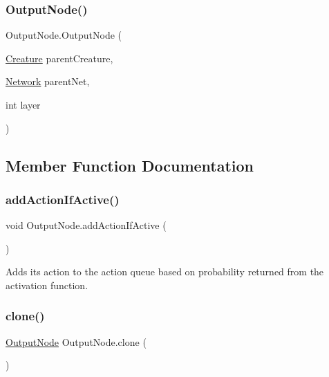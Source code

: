 \subsubsection{\texorpdfstring{Output\+Node()}{OutputNode()}\hspace{0.1cm}{\footnotesize\ttfamily [2/2]}}
{\footnotesize\ttfamily Output\+Node.\+Output\+Node (\begin{DoxyParamCaption}\item[{\mbox{\hyperlink{class_creature}{Creature}}}]{parent\+Creature,  }\item[{\mbox{\hyperlink{class_network}{Network}}}]{parent\+Net,  }\item[{int}]{layer }\end{DoxyParamCaption})}



\subsection{Member Function Documentation}
\mbox{\label{class_output_node_a6d6a43ded165156d825fd039487f2a10}} 
\subsubsection{\texorpdfstring{add\+Action\+If\+Active()}{addActionIfActive()}}
{\footnotesize\ttfamily void Output\+Node.\+add\+Action\+If\+Active (\begin{DoxyParamCaption}{ }\end{DoxyParamCaption})}



Adds its action to the action queue based on probability returned from the activation function. 

\mbox{\label{class_output_node_af4524058cc5cbb2fbd29aac4b970395f}} 
\subsubsection{\texorpdfstring{clone()}{clone()}}
{\footnotesize\ttfamily \mbox{\hyperlink{class_output_node}{Output\+Node}} Output\+Node.\+clone (\begin{DoxyParamCaption}{ }\end{DoxyParamCaption})}

